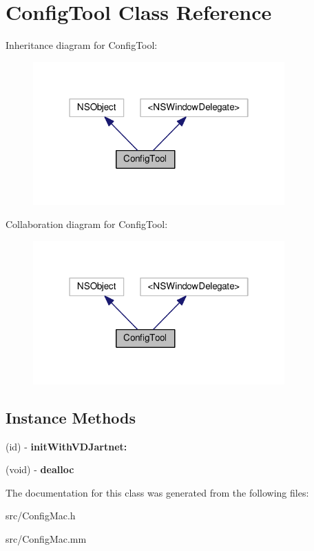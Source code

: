 \hypertarget{interfaceConfigTool}{}\section{Config\+Tool Class Reference}
\label{interfaceConfigTool}


Inheritance diagram for Config\+Tool\+:
\nopagebreak
\begin{figure}[H]
\begin{center}
\leavevmode
\includegraphics[width=274pt]{interfaceConfigTool__inherit__graph}
\end{center}
\end{figure}


Collaboration diagram for Config\+Tool\+:
\nopagebreak
\begin{figure}[H]
\begin{center}
\leavevmode
\includegraphics[width=274pt]{interfaceConfigTool__coll__graph}
\end{center}
\end{figure}
\subsection*{Instance Methods}
\begin{DoxyCompactItemize}
\item 
\mbox{\label{interfaceConfigTool_a9909af259d86d8b9b32440b6ef1a14bd}} 
(id) -\/ {\bfseries init\+With\+V\+D\+Jartnet\+:}
\item 
\mbox{\label{interfaceConfigTool_af3f58f91aca9a9c58647b8de7b49db00}} 
(void) -\/ {\bfseries dealloc}
\end{DoxyCompactItemize}


The documentation for this class was generated from the following files\+:\begin{DoxyCompactItemize}
\item 
src/Config\+Mac.\+h\item 
src/Config\+Mac.\+mm\end{DoxyCompactItemize}
